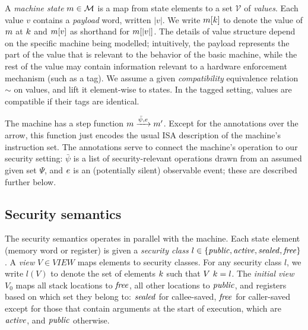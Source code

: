 \documentclass[10pt,conference]{ieeetran}%
\theoremstyle{definition}
\begin{document}
A {\em machine state} \(m \in {\mathcal M}\) is a map from state elements to a set \(\mathcal{V}\) of
\emph{values}.
Each value \(v\) contains a \emph{payload} word, written \(|v|\).
We write \(m[k]\) to denote the value of \(m\) at
\(k\)  and \(m[v]\) as shorthand for \(m[|v|]\).
The details of value structure depend on the specific machine being modelled;
intuitively, the payload represents the part of the value that is relevant to
the behavior of the basic machine, while the rest of the value may contain
information relevant to a hardware enforcement mechanism (such as a tag).
We assume a given \emph{compatibility} equivalence relation \(\sim\) on values,
and lift it element-wise to states.
In the tagged setting, values are compatible if their tags are identical.

The machine has a step function \(m \xrightarrow{\bar{\psi},e} m'\).
Except for the annotations over the arrow, this function just encodes the usual
ISA description of the machine's instruction set. The annotations serve to connect
the machine's operation to our security setting:
\(\bar{\psi}\) is a list of security-relevant operations drawn from an assumed given set \(\Psi\),
and \(e\) is an (potentially silent) observable event; these are described further below.

\subsection{Security semantics}

The security semantics operates in parallel with the machine.
Each state element (memory word or register) is given a \emph{security class}
\(l \in \{\mathit{public}, \mathit{active}, \mathit{sealed}, \mathit{free}\}\).
A \emph{view} \(V \in \mathit{VIEW}\) maps elements to security classes.
For any security class \(l\), we write \(l(V)\)
to denote the set of elements \(k\) such that \(V ~ k = l\).
The {\it initial view} \(V_0\) maps all stack locations to \(\mathit{free}\),
all other locations to \(\mathit{public}\), and registers based on which set they
belong to: \(\mathit{sealed}\) for callee-saved, \(\mathit{free}\) for caller-saved except for those
that contain arguments at the start of execution, which are \(\mathit{active}\), and \(\mathit{public}\) otherwise.
\end{document}
